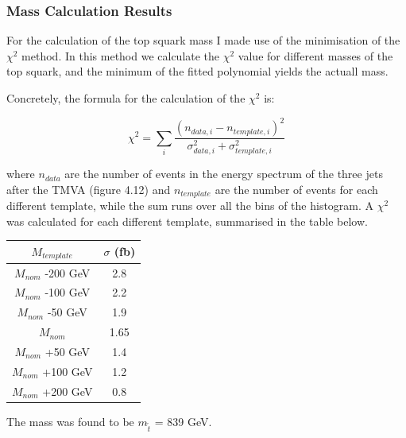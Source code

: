 \documentclass[12pt,a4paper]{report}
\begin{document}
\subsubsection{Mass Calculation Results}

For the calculation of the top squark mass I made use of the minimisation of the $\chi^{2}$ method. In this 
method we calculate the $\chi^{2}$ value for different masses of the top squark, and the minimum of the fitted
polynomial yields the actuall mass.

Concretely, the formula for the calculation of the $\chi^{2}$ is:

\begin{equation}
 \chi^{2}=\sum_{i}^{}\frac{(n_{data,i}-n_{template,i})^{2}}{\sigma_{data,i}^{2}+\sigma_{template,i}^{2}}
\end{equation}

where $n_{data}$ are the number of events in the energy spectrum of the three jets after the TMVA (figure 4.12)
and $n_{template}$ are the number of events for each different template, while the sum runs over all the bins
of the histogram. A $\chi^{2}$ was calculated for each different template, summarised in the table below.


\hfill

\begin{table}[h]
\centering %
\begin{tabular}{||c | c||} %
\hline \hline %
$M_{template}$ 		   & $\sigma$ (fb)   \\ \hline %
$M_{nom}$ -200 GeV         &   2.8   \\
$M_{nom}$ -100 GeV         &   2.2   \\
$M_{nom}$ -50  GeV         &   1.9   \\  
$M_{nom}$        	   &  1.65   \\
$M_{nom}$ +50  GeV	   &   1.4   \\
$M_{nom}$ +100 GeV	   &   1.2   \\
$M_{nom}$ +200 GeV	   &   0.8   \\

\hline
\end{tabular}
\label{table:nonlin} %
\end{table}

The mass was found  to be $m_{\tilde{t}}$ = 839 GeV.


\newpage
\end{document}
